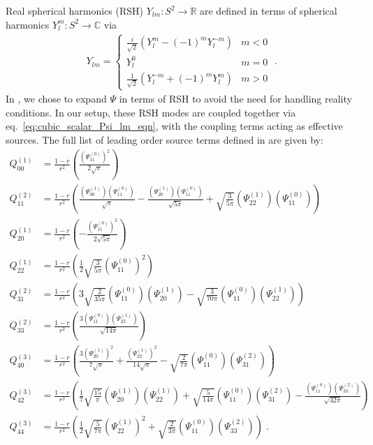 Real spherical harmonics (RSH) $Y_{lm} : S^2 \to \mathbb{R}$ are defined in terms of spherical harmonics $Y_l^m : S^2 \to \mathbb{C}$ via
\begin{align}
  Y_{lm} =
  \begin{cases}
    \frac{i}{\sqrt{2}} (Y_l^m - (-1)^m Y_l^{-m}) & m < 0 \\
    Y_l^0 & m = 0 \\
    \frac{1}{\sqrt{2}} (Y_l^{-m} + (-1)^m Y_l^m) & m > 0 
  \end{cases}
  \;.
\end{align}
In , we chose to expand $\Psi$ in terms of RSH to avoid the need for handling reality conditions.
In our setup, these RSH modes are coupled together via eq.~\eqref{eq:cubic_scalar_Psi_lm_eqn}, with the coupling terms acting as effective sources.
The full list of leading order source terms defined in  are given by:
\begin{align}
  \label{eq:Q_lm_leading_order}
  Q_{00}^{(1)} & = \frac{1-r}{r^2} \left( \frac{(\Psi^{(0)}_{11})^2}{2 \sqrt{\pi }} \right) \nonumber \\
  Q_{11}^{(2)} & = \frac{1-r}{r^2} \left( \frac{(\Psi^{(1)}_{00}) (\Psi^{(0)}_{11})}{\sqrt{\pi }}-\frac{(\Psi^{(1)}_{20}) (\Psi^{(0)}_{11})}{\sqrt{5 \pi }}+\sqrt{\frac{3}{5 \pi }} (\Psi^{(1)}_{22}) (\Psi^{(0)}_{11}) \right) \nonumber \\
  Q_{20}^{(1)} & = \frac{1-r}{r^2} \left( -\frac{(\Psi^{(0)}_{11})^2}{2 \sqrt{5 \pi }} \right) \nonumber \\
  Q_{22}^{(1)} &= \frac{1-r}{r^2} \left( \frac{1}{2} \sqrt{\frac{3}{5 \pi }} (\Psi^{(0)}_{11})^2 \right) \nonumber \\
  Q_{31}^{(2)} & = \frac{1-r}{r^2} \left( 3 \sqrt{\frac{2}{35 \pi }} (\Psi^{(0)}_{11}) (\Psi^{(1)}_{20})-\sqrt{\frac{3}{70 \pi }} (\Psi^{(0)}_{11}) (\Psi^{(1)}_{22}) \right) \nonumber \\
  Q_{33}^{(2)} & = \frac{1-r}{r^2} \left( \frac{3 (\Psi^{(0)}_{11}) (\Psi^{(1)}_{22})}{\sqrt{14 \pi }} \right) \nonumber \\
  Q_{40}^{(3)} & = \frac{1-r}{r^2} \left( \frac{3 (\Psi^{(1)}_{20})^2}{7 \sqrt{\pi }}+\frac{(\Psi^{(1)}_{22})^2}{14 \sqrt{\pi }}-\sqrt{\frac{2}{7 \pi }} (\Psi^{(0)}_{11}) (\Psi^{(2)}_{31}) \right) \nonumber \\
  Q_{42}^{(3)} & = \frac{1-r}{r^2} \left( \frac{1}{7} \sqrt{\frac{15}{\pi }} (\Psi^{(1)}_{20}) (\Psi^{(1)}_{22})+\sqrt{\frac{5}{14 \pi }} (\Psi^{(0)}_{11}) (\Psi^{(2)}_{31})-\frac{(\Psi^{(0)}_{11}) (\Psi^{(2)}_{33})}{\sqrt{42 \pi }} \right) \nonumber \\
  Q_{44}^{(3)} & = \frac{1-r}{r^2} \left( \frac{1}{2} \sqrt{\frac{5}{7 \pi }} (\Psi^{(1)}_{22})^2+\sqrt{\frac{2}{3 \pi }} (\Psi^{(0)}_{11}) (\Psi^{(2)}_{33}) \right) \;.
\end{align}






